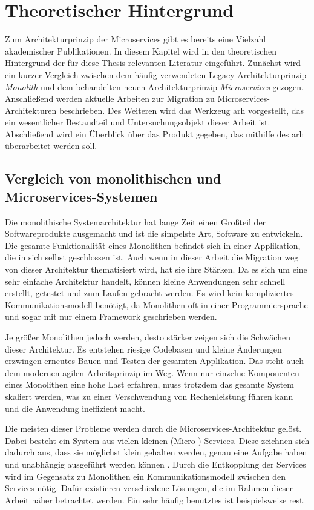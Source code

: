 \chapter{Theoretischer Hintergrund}
\label{chap:theoretischer-hintergrund}
Zum Architekturprinzip der Microservices gibt es bereits eine Vielzahl akademischer Publikationen.
In diesem Kapitel wird in den theoretischen Hintergrund der für diese Thesis relevanten Literatur eingeführt.
Zunächst wird ein kurzer Vergleich zwischen dem häufig verwendeten Legacy-Architekturprinzip \emph{Monolith} und dem behandelten neuen Architekturprinzip \emph{Microservices} gezogen.
Anschließend werden aktuelle Arbeiten zur Migration zu Microservices-Architekturen beschrieben.
Des Weiteren wird das Werkzeug \gls{arh} vorgestellt, das ein wesentlicher Bestandteil und Untersuchungsobjekt dieser Arbeit ist.
Abschließend wird ein Überblick über das Produkt gegeben, das mithilfe des \gls{arh} überarbeitet werden soll.

\section{Vergleich von monolithischen und Microservices-Systemen}

Die monolithische Systemarchitektur hat lange Zeit einen Großteil der Softwareprodukte ausgemacht und ist die simpelste Art, Software zu entwickeln.
Die gesamte Funktionalität eines Monolithen befindet sich in einer Applikation, die in sich selbst geschlossen ist. 
Auch wenn in dieser Arbeit die Migration weg von dieser Architektur thematisiert wird, hat sie ihre Stärken.
Da es sich um eine sehr einfache Architektur handelt, können kleine Anwendungen sehr schnell erstellt, getestet und zum Laufen gebracht werden.
Es wird kein kompliziertes Kommunikationsmodell benötigt, da Monolithen oft in einer Programmiersprache und sogar mit nur einem Framework geschrieben werden.

Je größer Monolithen jedoch werden, desto stärker zeigen sich die Schwächen dieser Architektur.
Es entstehen riesige Codebasen und kleine Änderungen erzwingen erneutes Bauen und Testen der gesamten Applikation.
Das steht auch dem modernen agilen Arbeitsprinzip im Weg.
Wenn nur einzelne Komponenten eines Monolithen eine hohe Last erfahren, muss trotzdem das gesamte System skaliert werden, was zu einer Verschwendung von Rechenleistung führen kann und die Anwendung ineffizient macht.

Die meisten dieser Probleme werden durch die Microservices-Architektur gelöst.
Dabei besteht ein System aus vielen kleinen (Micro-) Services.
Diese zeichnen sich dadurch aus, dass sie möglichst klein gehalten werden, genau eine Aufgabe haben und unabhängig ausgeführt werden können \cite{10220070}.
Durch die Entkopplung der Services wird im Gegensatz zu Monolithen ein Kommunikationsmodell zwischen den Services nötig.
Dafür existieren verschiedene Lösungen, die im Rahmen dieser Arbeit näher betrachtet werden.
Ein sehr häufig benutztes ist beispielsweise \gls{rest}.

